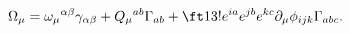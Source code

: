 \begin{equation}
\Omega_\mu=\omega_\mu{}^{\alpha\beta}\gamma_{\alpha\beta}
+Q_\mu{}^{ab}\Gamma_{ab}+\ft1{3!}e^{ia}e^{jb}e^{kc}\partial_\mu\phi_{ijk}
\Gamma_{abc}.
\label{eq:gencon}
\end{equation}

